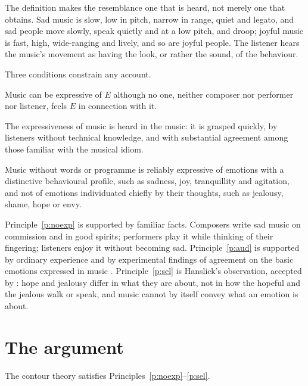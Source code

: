 \documentclass{situationist-preprint}
\begin{document}
The definition makes the resemblance one that is heard, not merely one that obtains. Sad music is slow, low in pitch, narrow in range, quiet and legato, and sad people move slowly, speak quietly and at a low pitch, and droop; joyful music is fast, high, wide-ranging and lively, and so are joyful people. The listener hears the music's movement as having the look, or rather the sound, of the behaviour.

Three conditions constrain any account.

\begin{principle}[No expresser]\label{p:noexp}
Music can be expressive of $E$ although no one, neither composer nor performer nor listener, feels $E$ in connection with it.
\end{principle}

\begin{principle}[Audibility]\label{p:aud}
The expressiveness of music is heard in the music: it is grasped quickly, by listeners without technical knowledge, and with substantial agreement among those familiar with the musical idiom.
\end{principle}

\begin{principle}[Selectivity]\label{p:sel}
Music without words or programme is reliably expressive of emotions with a distinctive behavioural profile, such as sadness, joy, tranquillity and agitation, and not of emotions individuated chiefly by their thoughts, such as jealousy, shame, hope or envy.
\end{principle}

Principle~\ref{p:noexp} is supported by familiar facts. Composers write sad music on commission and in good spirits; performers play it while thinking of their fingering; listeners enjoy it without becoming sad. Principle~\ref{p:aud} is supported by ordinary experience and by experimental findings of agreement on the basic emotions expressed in music \citep{JuslinLaukka2003}. Principle~\ref{p:sel} is Hanslick's observation, accepted by \citet{Kivy1980}: hope and jealousy differ in what they are about, not in how the hopeful and the jealous walk or speak, and music cannot by itself convey what an emotion is about.

\section{The argument}

\begin{lemma}\label{l:ct}
The contour theory satisfies Principles~\ref{p:noexp}--\ref{p:sel}.
\end{lemma}
\end{document}
